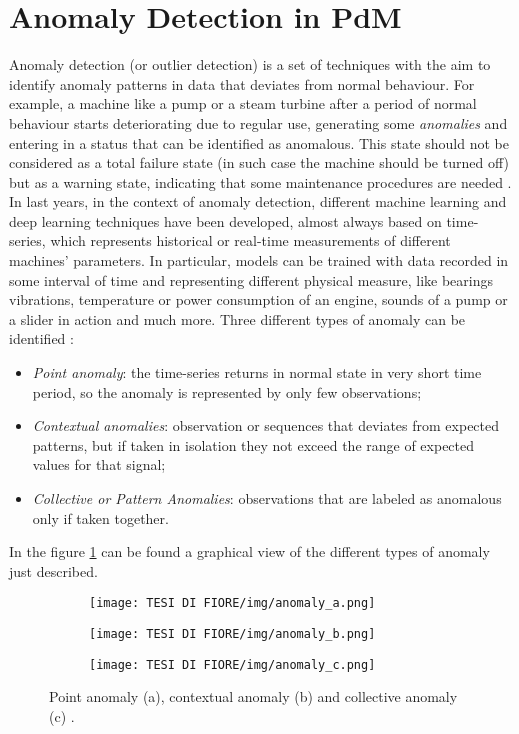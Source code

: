 \section{Anomaly Detection in PdM}
Anomaly detection (or outlier detection) is a set of techniques with the aim to identify anomaly patterns in data that deviates from normal behaviour. For example, a machine like a pump or a steam turbine after a period of normal behaviour starts deteriorating due to regular use, generating some \textit{anomalies} and entering in a status that can be identified as anomalous. This state should not be considered as a total failure state (in such case the machine should be turned off) but as a warning state, indicating that some maintenance procedures are needed \cite{5AnomalyDetectionSurvey}.\\
In last years, in the context of anomaly detection, different machine learning and deep learning techniques have been developed, almost always based on time-series, which represents historical or real-time measurements of different machines' parameters. In particular, models can be trained with data recorded in some interval of time and representing different physical measure, like bearings vibrations, temperature or power consumption of an engine, sounds of a pump or a slider in action and much more. Three different types of anomaly can be identified \cite{6AnomalyIoTTimeSeries}: 
\begin{itemize}
\item{\textit{Point anomaly}: the time-series returns in normal state in very short time period, so the anomaly is represented by only few observations;}
\item{\textit{Contextual anomalies}: observation or sequences that deviates from expected patterns, but if taken in isolation they not exceed the range of expected values for that signal;}
\item{\textit{Collective or Pattern Anomalies}: observations that are labeled as anomalous only if taken together.}
\end{itemize}
In the figure \ref{anomalies} can be found a graphical view of the different types of anomaly just described. 
\begin{figure}[ht]
\centering
\begin{subfigure}
    \centering
    \texttt{[image: TESI DI FIORE/img/anomaly\_a.png]}
\end{subfigure}
\begin{subfigure}
    \centering
    \texttt{[image: TESI DI FIORE/img/anomaly\_b.png]}
\end{subfigure}
\begin{subfigure}
    \centering
    \texttt{[image: TESI DI FIORE/img/anomaly\_c.png]}
\end{subfigure}
\caption{Point anomaly (a), contextual anomaly (b) and collective anomaly (c) \cite{6AnomalyIoTTimeSeries}.}
\label{anomalies}
\end{figure}

